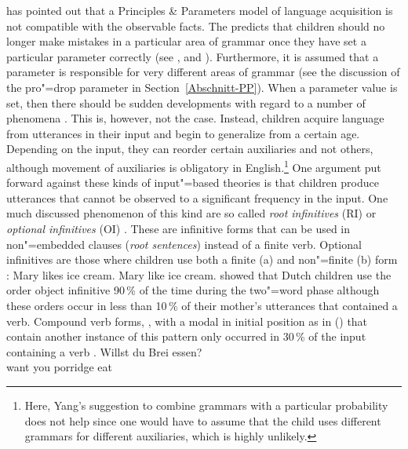 \citet{Tomasello2000a,Tomasello2003a} has pointed out that a Principles \& Parameters model of language acquisition
is not compatible with the observable facts. The \ppt predicts that children should no longer make mistakes in a particular area of grammar once they have set
a particular parameter correctly (see \citealp[]{Chomsky86}, \citealp[--22]{Radford90a-u} and \citealp[]{Lightfoot97a}).
Furthermore, it is assumed that a parameter is responsible for very different areas of grammar (see the discussion of the pro"=drop parameter in
Section~\ref{Abschnitt-PP}). When a parameter value is set, then there should be sudden developments with regard to a number
of phenomena \citep[]{Lightfoot97a}. This is, however, not the case. Instead, children acquire language from utterances in their input
and begin to generalize from a certain age. Depending on the input, they can reorder certain auxiliaries and not others, although
movement of auxiliaries is obligatory in English.\footnote{ 
	Here, Yang's suggestion to combine grammars with a particular probability does not help since one
	would have to assume that the child uses different grammars for different auxiliaries, which
        is highly unlikely.
}
One argument put forward against these kinds of input"=based theories is that children produce utterances that cannot be observed
to a significant frequency in the input. One much discussed phenomenon of this kind are so called \emph{root infinitives} (RI) or \emph{optional
  infinitives} (OI) \citep{Wexler98a}. These are infinitive forms that can be used in non"=embedded clauses (\emph{root sentences})
instead of a finite verb. Optional infinitives are those where children use both a finite (a) and non"=finite (b) form \citep[]{Wexler98a}:
\eal
\ex Mary likes ice cream.
\ex Mary like ice cream.
\zl
\citet*[]{WKG2001a} showed that Dutch children use the order object infinitive 90\,\% of the time during the two"=word phase although
these orders occur in less than 10\,\% of their mother's utterances that contained a verb.
Compound verb forms, \eg, with a modal in initial position as in () that contain another instance of this pattern only occurred in 30\,\% of the input containing
a verb \citep*[]{WKG2001a}.
\ea
\gll Willst du Brei essen?\\
     want   you porridge eat\\
